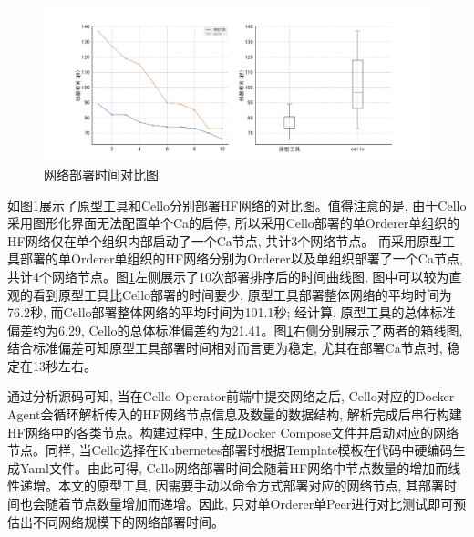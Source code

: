 \begin{figure}[h] %
    \centering %
    \includegraphics[width=1.0\textwidth]{FIGs/chapter6/plt_deployment.png} %
    \caption{网络部署时间对比图} %
    \label{plt_deployment} %
\end{figure}%

如图\ref{plt_deployment}展示了原型工具和Cello分别部署HF网络的对比图。值得注意的是, 由于Cello采用图形化界面无法配置单个Ca的启停, 所以采用Cello部署的单Orderer单组织的HF网络仅在单个组织内部启动了一个Ca节点, 共计3个网络节点。 而采用原型工具部署的单Orderer单组织的HF网络分别为Orderer以及单组织部署了一个Ca节点, 共计4个网络节点。图\ref{plt_deployment}左侧展示了10次部署排序后的时间曲线图, 图中可以较为直观的看到原型工具比Cello部署的时间要少, 原型工具部署整体网络的平均时间为76.2秒, 而Cello部署整体网络的平均时间为101.1秒; 经计算, 原型工具的总体标准偏差约为6.29, Cello的总体标准偏差约为21.41。图\ref{plt_deployment}右侧分别展示了两者的箱线图, 结合标准偏差可知原型工具部署时间相对而言更为稳定, 尤其在部署Ca节点时, 稳定在13秒左右。

通过分析源码\footnotemark[1]可知, 当在Cello Operator前端中提交网络之后, Cello对应的Docker Agent会循环解析传入的HF网络节点信息及数量的数据结构, 解析完成后串行构建HF网络中的各类节点。构建过程中, 生成Docker Compose文件并启动对应的网络节点。同样, 当Cello选择在Kubernetes部署时根据Template模板在代码中硬编码生成Yaml文件。由此可得, Cello网络部署时间会随着HF网络中节点数量的增加而线性递增。本文的原型工具, 因需要手动以命令方式部署对应的网络节点, 其部署时间也会随着节点数量增加而递增。因此, 只对单Orderer单Peer进行对比测试即可预估出不同网络规模下的网络部署时间。

